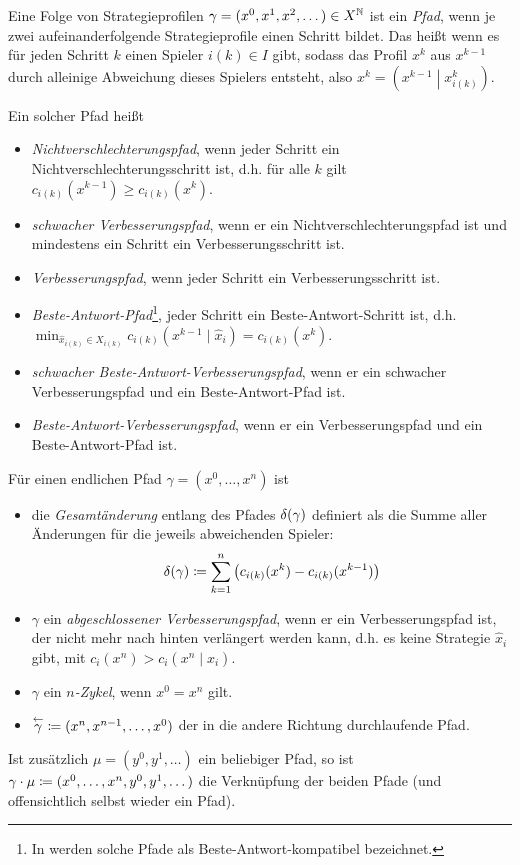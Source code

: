 \begin{defn}\label{defn:Pfade}
	Eine Folge von Strategieprofilen $\gamma = (x^0, x^1, x^2, \dots) \in X^{\mathbb{N}}$ ist ein \emph{Pfad}, wenn je zwei aufeinanderfolgende Strategieprofile einen Schritt bildet. Das heißt wenn es für jeden Schritt $k$ einen Spieler $i(k) \in I$ gibt, sodass das Profil $x^{k}$ aus $x^{k-1}$ durch alleinige Abweichung dieses Spielers entsteht, also $x^{k} = \left(x^{k-1} \middle| x^{k}_{i(k)}\right)$.
	
	Ein solcher Pfad heißt
	\begin{itemize}
		\item \emph{Nichtverschlechterungspfad}, wenn jeder Schritt ein Nichtverschlechterungsschritt ist, d.h. für alle $k$ gilt $c_{i(k)}(x^{k-1}) \geq c_{i(k)}(x^{k})$.
		\item \emph{schwacher Verbesserungspfad}, wenn er ein Nichtverschlechterungspfad ist und mindestens ein Schritt ein Verbesserungsschritt ist.
		\item \emph{Verbesserungspfad}, wenn jeder Schritt ein Verbesserungsschritt ist.
		\item \emph{Beste-Antwort-Pfad}\footnote{In \cite{BestRespPot} werden solche Pfade als \glqq Beste-Antwort-kompatibel\grqq{} bezeichnet.}, jeder Schritt ein Beste-Antwort-Schritt ist, d.h. $\min_{\hat{x}_{i(k)} \in X_{i(k)}} c_{i(k)}(x^{k-1} \mid \hat{x}_i) = c_{i(k)}(x^k)$.
		\item \emph{schwacher Beste-Antwort-Verbesserungspfad}, wenn er ein schwacher Verbesserungspfad und ein Beste-Antwort-Pfad ist.
		\item \emph{Beste-Antwort-Verbesserungspfad}, wenn er ein Verbesserungspfad und ein Beste-Antwort-Pfad ist.
	\end{itemize}
\end{defn}

\begin{defn}\label{defn:Pfade2}	
	Für einen endlichen Pfad $\gamma = (x^0, \dots, x^n)$ ist
	\begin{itemize}
		\item die \emph{Gesamtänderung} entlang des Pfades $\delta(\gamma)$ definiert als die Summe aller Änderungen für die jeweils abweichenden Spieler:
		\[\delta(\gamma) \coloneqq \sum_{k=1}^{n} \left(c_{i(k)}(x^k) - c_{i(k)}(x^{k-1})\right) \]
		\item $\gamma$ ein \emph{abgeschlossener Verbesserungspfad}, wenn er ein Verbesserungspfad ist, der nicht mehr nach hinten verlängert werden kann, d.h. es keine Strategie $\hat{x}_i$ gibt, mit $c_{i}(x^n) > c_{i}(x^n \mid \hat{x}_i)$.
		\item $\gamma$ ein \emph{$n$-Zykel}, wenn $x^0 = x^n$ gilt.
		\item $\overset{\leftarrow}{\gamma} \coloneqq (x^n, x^{n-1}, \dots, x^0)$ der in die andere Richtung durchlaufende Pfad.
	\end{itemize}

	Ist zusätzlich $\mu = (y^0, y^1, \dots)$ ein beliebiger Pfad, so ist $\gamma\cdot\mu \coloneqq (x^0, \dots, x^n, y^0, y^1, \dots)$ die Verknüpfung der beiden Pfade (und offensichtlich selbst wieder ein Pfad).
\end{defn}

